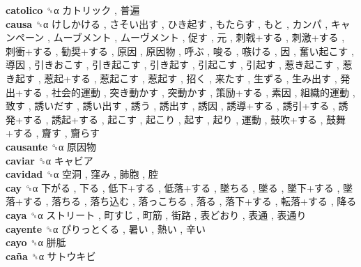 \textbf{catolico} ␝α   カトリック ,  普遍   \\
\textbf{causa} ␝α   けしかける ,  さそい出す ,  ひき起す ,  もたらす ,  もと ,  カンパ ,  キャンペーン ,  ムーブメント ,  ムーヴメント ,  促す ,  元 ,  刺戟+する ,  刺激+する ,  刺衝+する ,  勧奨+する ,  原因 ,  原因物 ,  呼ぶ ,  唆る ,  嗾ける ,  因 ,  奮い起こす ,  導因 ,  引きおこす ,  引き起こす ,  引き起す ,  引起こす ,  引起す ,  惹き起こす ,  惹き起す ,  惹起+する ,  惹起こす ,  惹起す ,  招く ,  来たす ,  生ずる ,  生み出す ,  発出+する ,  社会的運動 ,  突き動かす ,  突動かす ,  策励+する ,  素因 ,  組織的運動 ,  致す ,  誘いだす ,  誘い出す ,  誘う ,  誘出す ,  誘因 ,  誘導+する ,  誘引+する ,  誘発+する ,  誘起+する ,  起こす ,  起こり ,  起す ,  起り ,  運動 ,  鼓吹+する ,  鼓舞+する ,  齎す ,  齎らす   \\
\textbf{causante} ␝α   原因物   \\
\textbf{caviar} ␝α   キャビア   \\
\textbf{cavidad} ␝α   空洞 ,  窪み ,  肺胞 ,  腔   \\
\textbf{cay} ␝α   下がる ,  下る ,  低下+する ,  低落+する ,  墜ちる ,  墜る ,  墜下+する ,  墜落+する ,  落ちる ,  落ち込む ,  落っこちる ,  落る ,  落下+する ,  転落+する ,  降る   \\
\textbf{caya} ␝α   ストリート ,  町すじ ,  町筋 ,  街路 ,  表どおり ,  表通 ,  表通り   \\
\textbf{cayente} ␝α   ぴりっとくる ,  暑い ,  熱い ,  辛い   \\
\textbf{cayo} ␝α   胼胝   \\
\textbf{caña} ␝α   サトウキビ   \\
